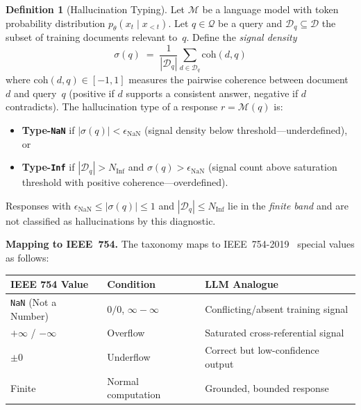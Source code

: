 \documentclass[11pt]{article}
\theoremstyle{definition}
\newtheorem{definition}[theorem]{Definition}
\theoremstyle{remark}
\newcommand{\NaN}{\texttt{NaN}}
\newcommand{\Inf}{\texttt{Inf}}
\begin{document}
\begin{definition}[Hallucination Typing]
\label{def:hallucination-type}
Let $\mathcal{M}$ be a language model with token probability distribution
$p_\theta(x_t \mid x_{<t})$.  Let $q \in \mathcal{Q}$ be a query and
$\mathcal{D}_q \subseteq \mathcal{D}$ the subset of training documents
relevant to~$q$.  Define the \emph{signal density}
\begin{equation}
  \label{eq:signal-density}
  \sigma(q) \;=\; \frac{1}{|\mathcal{D}_q|}
    \sum_{d \in \mathcal{D}_q} \mathrm{coh}(d, q)
\end{equation}
where $\mathrm{coh}(d, q) \in [-1, 1]$ measures the pairwise coherence
between document~$d$ and query~$q$ (positive if $d$ supports a consistent
answer, negative if $d$ contradicts).  The hallucination type of a response
$r = \mathcal{M}(q)$ is:
\begin{itemize}
  \item \textbf{Type-\NaN{}} if $|\sigma(q)| < \epsilon_{\mathrm{NaN}}$
    (signal density below threshold---underdefined), or
  \item \textbf{Type-\Inf{}} if $|\mathcal{D}_q| > N_{\mathrm{Inf}}$ and
    $\sigma(q) > \epsilon_{\mathrm{NaN}}$ (signal count above saturation
    threshold with positive coherence---overdefined).
\end{itemize}
Responses with $\epsilon_{\mathrm{NaN}} \leq |\sigma(q)| \leq 1$ and
$|\mathcal{D}_q| \leq N_{\mathrm{Inf}}$ lie in the \emph{finite band}
and are not classified as hallucinations by this diagnostic.
\end{definition}

\medskip
\noindent\textbf{Mapping to IEEE~754.}\quad
The taxonomy maps to IEEE~754-2019~\cite{ieee754-2019} special values as
follows:

\begin{center}
\begin{tabular}{lll}
\toprule
\textbf{IEEE 754 Value} & \textbf{Condition} & \textbf{LLM Analogue} \\
\midrule
\texttt{NaN} (Not a Number) & $0/0$, $\infty - \infty$ & Conflicting/absent training signal \\
$+\infty$ / $-\infty$ & Overflow & Saturated cross-referential signal \\
$\pm 0$ & Underflow & Correct but low-confidence output \\
Finite & Normal computation & Grounded, bounded response \\
\bottomrule
\end{tabular}
\end{center}
\end{document}
